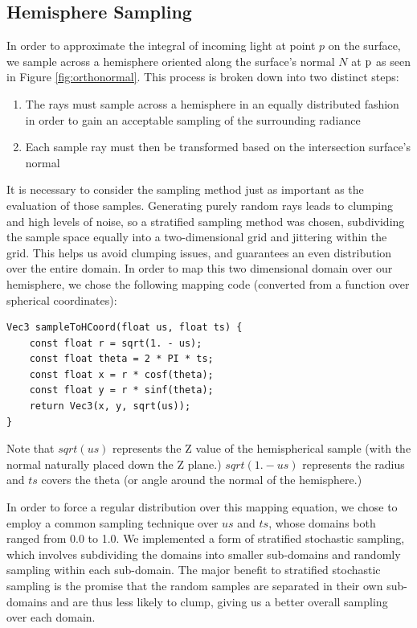 \documentclass[12pt]{ucthesis}
\begin{document}
\subsection{Hemisphere Sampling}

In order to approximate the integral of incoming light at point $p$ on the surface, we sample across a hemisphere oriented along the surface's normal $N$ at $\textup{p}$ as seen in Figure \ref{fig:orthonormal}.  This process is broken down into two distinct steps:

\begin{enumerate}
    \item The rays must sample across a hemisphere in an equally distributed fashion in order to gain an acceptable sampling of the surrounding radiance
    \item Each sample ray must then be transformed based on the intersection surface's normal
\end{enumerate}

It is necessary to consider the sampling method just as important as the evaluation of those samples.  Generating purely random rays leads to clumping and high levels of noise, so a stratified sampling method was chosen, subdividing the sample space equally into a two-dimensional grid and jittering within the grid.  This helps us avoid clumping issues, and guarantees an even distribution over the entire domain.  In order to map this two dimensional domain over our hemisphere, we chose the following mapping code (converted from a function over spherical coordinates):


\begin{lstlisting}
Vec3 sampleToHCoord(float us, float ts) {
    const float r = sqrt(1. - us);
    const float theta = 2 * PI * ts;
    const float x = r * cosf(theta);
    const float y = r * sinf(theta);
    return Vec3(x, y, sqrt(us));
}
\end{lstlisting}

Note that $sqrt(us)$ represents the Z value of the hemispherical sample (with the normal naturally placed down the Z plane.)  $sqrt(1. - us)$ represents the radius and $ts$ covers the theta (or angle around the normal of the hemisphere.)

In order to force a regular distribution over this mapping equation, we chose to employ a common sampling technique over $us$ and $ts$, whose domains both ranged from 0.0 to 1.0.  We implemented a form of stratified stochastic sampling, which involves subdividing the domains into smaller sub-domains and randomly sampling within each sub-domain.  The major benefit to stratified stochastic sampling is the promise that the random samples are separated in their own sub-domains and are thus less likely to clump, giving us a better overall sampling over each domain.
\end{document}
